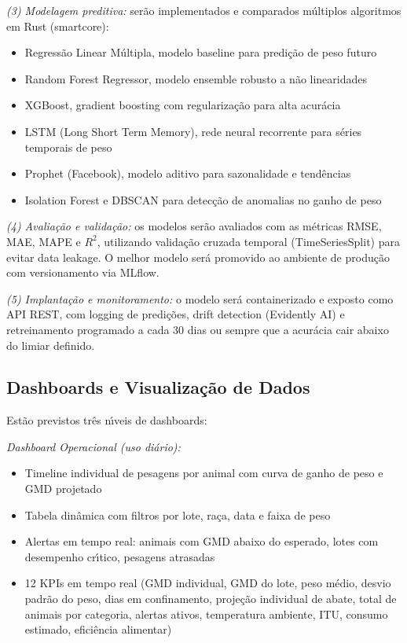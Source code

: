 \documentclass[12pt,a4paper]{article}
\begin{document}
\textit{(3) Modelagem preditiva:} ser\~ao implementados e comparados m\'ultiplos algoritmos em Rust (smartcore):

\begin{itemize}[leftmargin=*]
\item Regress\~ao Linear M\'ultipla, modelo baseline para predi\c c\~ao de peso futuro
\item Random Forest Regressor, modelo ensemble robusto a n\~ao linearidades
\item XGBoost, gradient boosting com regulariza\c c\~ao para alta acur\'acia
\item LSTM (Long Short Term Memory), rede neural recorrente para s\'eries temporais de peso
\item Prophet (Facebook), modelo aditivo para sazonalidade e tend\^encias
\item Isolation Forest e DBSCAN para detec\c c\~ao de anomalias no ganho de peso
\end{itemize}

\textit{(4) Avalia\c c\~ao e valida\c c\~ao:} os modelos ser\~ao avaliados com as m\'etricas RMSE, MAE, MAPE e $R^2$, utilizando valida\c c\~ao cruzada temporal (TimeSeriesSplit) para evitar data leakage. O melhor modelo ser\'a promovido ao ambiente de produ\c c\~ao com versionamento via MLflow.

\textit{(5) Implanta\c c\~ao e monitoramento:} o modelo ser\'a containerizado e exposto como API REST, com logging de predi\c c\~oes, drift detection (Evidently AI) e retreinamento programado a cada 30 dias ou sempre que a acur\'acia cair abaixo do limiar definido.

\subsection{Dashboards e Visualiza\c c\~ao de Dados}

Est\~ao previstos tr\^es n\'{\i}veis de dashboards:

\textit{Dashboard Operacional (uso di\'ario):}

\begin{itemize}[leftmargin=*]
\item Timeline individual de pesagens por animal com curva de ganho de peso e GMD projetado
\item Tabela din\^amica com filtros por lote, ra\c ca, data e faixa de peso
\item Alertas em tempo real: animais com GMD abaixo do esperado, lotes com desempenho cr\'{\i}tico, pesagens atrasadas
\item 12 KPIs em tempo real (GMD individual, GMD do lote, peso m\'edio, desvio padr\~ao do peso, dias em confinamento, proje\c c\~ao individual de abate, total de animais por categoria, alertas ativos, temperatura ambiente, ITU, consumo estimado, efici\^encia alimentar)
\end{itemize}
\end{document}
